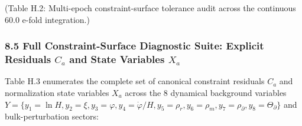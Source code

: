 \documentclass[aps,prd,onecolumn,superscriptaddress,nofootinbib,longbibliography,10pt]{revtex4-2}
\begin{document}
  (Table H.2: Multi-epoch constraint-surface tolerance audit across the continuous 60.0 e-fold integration.)



  
\subsubsection*{8.5 Full Constraint-Surface Diagnostic Suite: Explicit Residuals \(C_a\) and State Variables \(X_a\)}

  Table H.3 enumerates the complete set of canonical constraint residuals \(C_a\) and normalization state variables \(X_a\) across the 8 dynamical background variables \(Y = \{y_1 = \ln H, y_2 = \xi, y_3 = \varphi, y_4 = \dot{\varphi}/H, y_5 = \rho_r, y_6 = \rho_m, y_7 = \rho_\partial, y_8 = \Theta_\partial\}\) and bulk-perturbation sectors:
\end{document}
